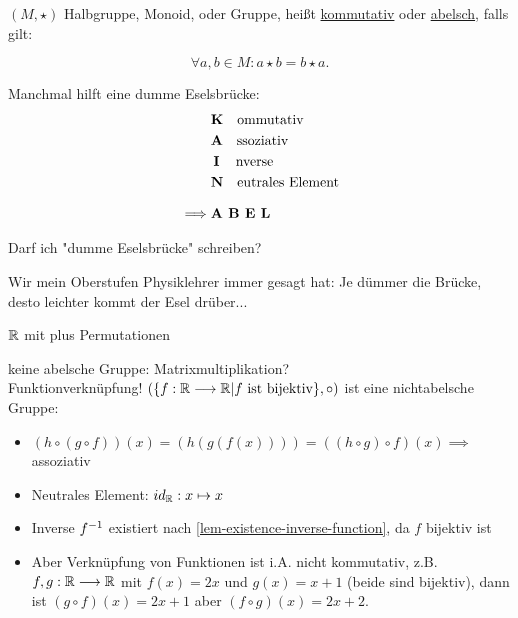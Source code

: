 \begin{definition}
    $(M, \star)$ Halbgruppe, Monoid, oder Gruppe, heißt \underline{kommutativ} oder \underline{abelsch}, falls gilt:

    $$\forall a, b \in M: a \star b = b \star a.$$
\end{definition}

Manchmal hilft eine dumme Eselsbrücke:
\begin{align*}
    & \text{\textbf{K}} \quad \text{ommutativ}\\
    & \text{\textbf{A}} \quad \text{ssoziativ}\\
    & \text{\textbf{\,I}} \quad \, \text{nverse}\\
    & \text{\textbf{N}} \quad \text{eutrales Element}\\[0.5\baselineskip]
    \implies & \text{\textbf{A B E L}}\\
\end{align*}

\begin{query}
    Darf ich "dumme Eselsbrücke" schreiben?

    Wir mein Oberstufen Physiklehrer immer gesagt hat: Je dümmer die Brücke, desto leichter kommt der Esel drüber...
\end{query}

\begin{example}
    $\mathbb{R}$ mit plus
    Permutationen

    keine abelsche Gruppe: Matrixmultiplikation?\\
    Funktionverknüpfung!
    $(\{f: \mathbb{R} \longrightarrow \mathbb{R} | f \text{ ist bijektiv}\}, \circ)$ ist eine nichtabelsche Gruppe:
    \begin{itemize}[label=]
        \item $(h \circ (g \circ f))(x) = (h(g(f(x)))) = ((h \circ g) \circ f)(x) \implies$ assoziativ
        \item Neutrales Element: $id_{\mathbb{R}}: x \mapsto x$
        \item Inverse $f^{-1}$ existiert nach \ref{lem-existence-inverse-function}, da $f$ bijektiv ist
        \item Aber Verknüpfung von Funktionen ist i.A. nicht kommutativ, z.B. $f, g: \mathbb{R} \longrightarrow \mathbb{R}$ mit $f(x) = 2x$ und $g(x) = x + 1$ (beide sind bijektiv), dann ist $(g \circ f)(x) = 2x + 1$ aber $(f \circ g)(x) = 2x + 2$.
    \end{itemize}
\end{example}

